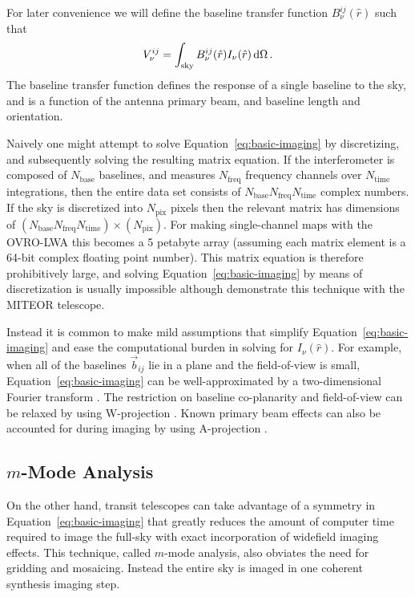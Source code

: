 \documentclass[twocolumn]{aastex61}
\renewcommand{\d}{{\rm d}}
\begin{document}
For later convenience we will define the baseline transfer function $B^{ij}_\nu(\hat r)$ such that
\begin{equation}\label{eq:baseline-transfer-function}
    V^{ij}_\nu = \int_\text{sky} B^{ij}_\nu(\hat r) I_\nu(\hat r) \,\d\Omega \, .
\end{equation}
The baseline transfer function defines the response of a single baseline to the sky, and is a
function of the antenna primary beam, and baseline length and orientation.

Naively one might attempt to solve Equation~\ref{eq:basic-imaging} by discretizing, and subsequently
solving the resulting matrix equation. If the interferometer is composed of $N_\text{base}$
baselines, and measures $N_\text{freq}$ frequency channels over $N_\text{time}$ integrations, then
the entire data set consists of $N_\text{base}N_\text{freq}N_\text{time}$ complex numbers. If the
sky is discretized into $N_\text{pix}$ pixels then the relevant matrix has dimensions of
$(N_\text{base}N_\text{freq}N_\text{time})\times(N_\text{pix})$. For making single-channel maps with
the OVRO-LWA this becomes a 5 petabyte array (assuming each matrix element is a 64-bit complex
floating point number).  This matrix equation is therefore prohibitively large, and solving
Equation~\ref{eq:basic-imaging} by means of discretization is usually impossible although
\citet{2017MNRAS.465.2901Z} demonstrate this technique with the MITEOR telescope.

Instead it is common to make mild assumptions that simplify Equation~\ref{eq:basic-imaging} and ease
the computational burden in solving for $I_\nu(\hat r)$. For example, when all of the baselines
$\vec b_{ij}$ lie in a plane and the field-of-view is small, Equation~\ref{eq:basic-imaging} can be
well-approximated by a two-dimensional Fourier transform \citep{2001isra.book.....T}. The
restriction on baseline co-planarity and field-of-view can be relaxed by using W-projection
\citep{2008ISTSP...2..647C}. Known primary beam effects can also be accounted for during imaging by
using A-projection \citep{2013ApJ...770...91B}.

\subsection{$m$-Mode Analysis}

On the other hand, transit telescopes can take advantage of a symmetry in
Equation~\ref{eq:basic-imaging} that greatly reduces the amount of computer time required to image
the full-sky with exact incorporation of widefield imaging effects. This technique, called $m$-mode
analysis, also obviates the need for gridding and mosaicing. Instead the entire sky is imaged in one
coherent synthesis imaging step.
\end{document}
